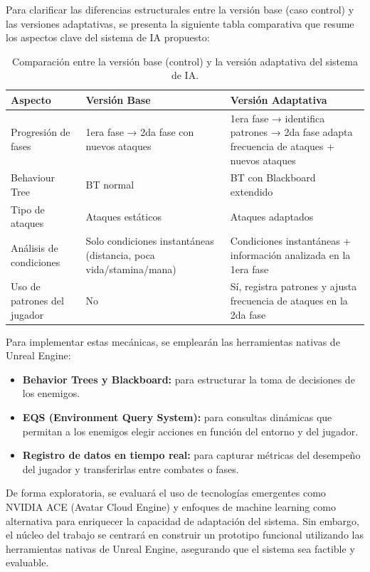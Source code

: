 \documentclass[informe]{upropuesta}
\begin{document}
Para clarificar las diferencias estructurales entre la versión base (caso control) y las versiones adaptativas, se presenta la siguiente tabla comparativa que resume los aspectos clave del sistema de IA propuesto:



\begin{table}[H]
\centering
\begin{tabular}{|p{3.2cm}|p{5cm}|p{5cm}|}
\hline
\textbf{Aspecto} & \textbf{Versión Base} & \textbf{Versión Adaptativa} \\ \hline
Progresión de fases & 1era fase → 2da fase con nuevos ataques & 1era fase → identifica patrones → 2da fase adapta frecuencia de ataques + nuevos ataques \\ \hline
Behaviour Tree & BT normal & BT con Blackboard extendido \\ \hline
Tipo de ataques & Ataques estáticos & Ataques adaptados \\ \hline
Análisis de condiciones & Solo condiciones instantáneas (distancia, poca vida/stamina/mana) & Condiciones instantáneas + información analizada en la 1era fase \\ \hline
Uso de patrones del jugador & No & Sí, registra patrones y ajusta frecuencia de ataques en la 2da fase \\ \hline
\end{tabular}
\caption{Comparación entre la versión base (control) y la versión adaptativa del sistema de IA.}
\end{table}







Para implementar estas mecánicas, se emplearán las herramientas nativas de Unreal Engine: 
\begin{itemize}
    \item \textbf{Behavior Trees y Blackboard:} para estructurar la toma de decisiones de los enemigos.
    \item \textbf{EQS (Environment Query System):} para consultas dinámicas que permitan a los enemigos elegir acciones en función del entorno y del jugador.
    \item \textbf{Registro de datos en tiempo real:} para capturar métricas del desempeño del jugador y transferirlas entre combates o fases.
\end{itemize}

De forma exploratoria, se evaluará el uso de tecnologías emergentes como NVIDIA ACE (Avatar Cloud Engine) y enfoques de machine learning como alternativa para enriquecer la capacidad de adaptación del sistema. Sin embargo, el núcleo del trabajo se centrará en construir un prototipo funcional utilizando las herramientas nativas de Unreal Engine, asegurando que el sistema sea factible y evaluable.
\end{document}
